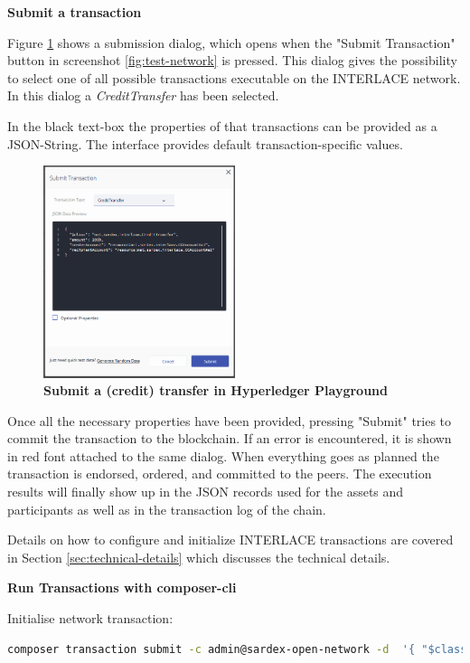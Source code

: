 \textbf{Submit a transaction}

Figure \ref{fig:submit-credit-transfer} shows a submission dialog, which opens when the "Submit Transaction" button in screenshot \ref{fig:test-network} is pressed. This dialog gives the possibility to select one of all possible transactions executable on the INTERLACE network. In this dialog a \textit{CreditTransfer} has been selected.

In the black text-box the properties of that transactions can be provided as a JSON-String. The interface provides default transaction-specific values.

\begin{figure}[htbp]
  \centering
  \includegraphics[width=0.5\textwidth]{Figures/submit-credit-transfer}
  \caption{\bf\small Submit a (credit) transfer in Hyperledger Playground}
  \label{fig:submit-credit-transfer}
\end{figure}

Once all the necessary properties have been provided, pressing "Submit" tries to commit the transaction to the blockchain. If an error is encountered, it is shown in red font attached to the same dialog. When everything goes as planned the transaction is endorsed, ordered, and committed to the peers. The execution results will finally show up in the JSON records used for the assets and participants as well as in the transaction log of the chain.

Details on how to configure and initialize INTERLACE transactions are covered in Section \ref{sec:technical-details} which discusses the technical details.

\textbf{Run Transactions with composer-cli}

Initialise network transaction:

\begin{lstlisting}[language=bash]
	composer transaction submit -c admin@sardex-open-network -d  '{ "$class": "net.sardex.interlace.InitBlockchain" }'
\end{lstlisting}

